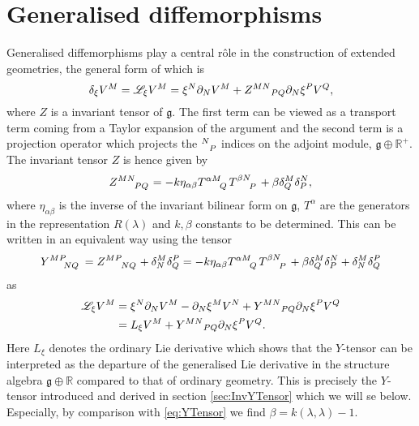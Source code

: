 \section{Generalised diffemorphisms}
Generalised diffemorphisms play a central rôle in the construction of extended geometries, the general form of which is
\begin{equation}
    \delta_\xi V^M = \mathscr{L}_\xi V^M = \xi^N\pd_N V^M+\tensor{Z}{^M^N}_{PQ}\pd_N\xi^PV^Q,
\end{equation}
where $Z$ is a invariant tensor of $\mathfrak{g}$. The first term can be viewed as a transport term coming from a Taylor expansion of the argument and the second term is a projection operator which projects the $\tensor{}{^N_P}$ indices on the adjoint module, $\mathfrak{g}\oplus \mathbb{R}^+$. The invariant tensor $Z$ is hence given by 
\begin{equation}
    \tensor{Z}{^M^N_P_Q} = -k\eta_{\alpha\beta}\tensor{T}{^\alpha^M_Q}\tensor{T}{^\beta^N_P}+\beta\delta^M_Q\delta^N_P,
\end{equation}
where $\eta_{\alpha\beta}$ is the inverse of the invariant bilinear form on $\mathfrak{g}$, $T^{\alpha}$ are the generators in the representation $R(\lambda)$ and $k,\beta$ constants to be determined. This can be written in an equivalent way using the tensor
\begin{equation}\label{eq:Y}
    \tensor{Y}{^M^P_N_Q} = \tensor{Z}{^M^P_N_Q}+\delta^M_N\delta^P_Q = -k\eta_{\alpha\beta}\tensor{T}{^\alpha^M_Q}\tensor{T}{^\beta^N_P}+\beta\delta^M_Q\delta^N_P+\delta^M_N\delta^P_Q
\end{equation}
as 
\begin{equation}
    \begin{aligned}
        \mathscr{L}_\xi V^M &= \xi^N\pd_N V^M-\pd_N\xi^MV^N+\tensor{Y}{^M^N}_{PQ}\pd_N\xi^PV^Q\\
        &= L_\xi V^M+\tensor{Y}{^M^N}_{PQ}\pd_N\xi^PV^Q.
    \end{aligned}
\end{equation}
Here $L_\xi$ denotes the ordinary Lie derivative which shows that the $Y$-tensor can be interpreted as the departure of the generalised Lie derivative in the structure algebra $\mathfrak{g}\oplus\mathbb{R}$ compared to that of ordinary geometry. This is precisely the $Y$-tensor introduced and derived in section \ref{sec:InvYTensor} which we will se below. Especially, by comparison with \eqref{eq:YTensor} we find $\beta = k(\lambda,\lambda)-1$. 

